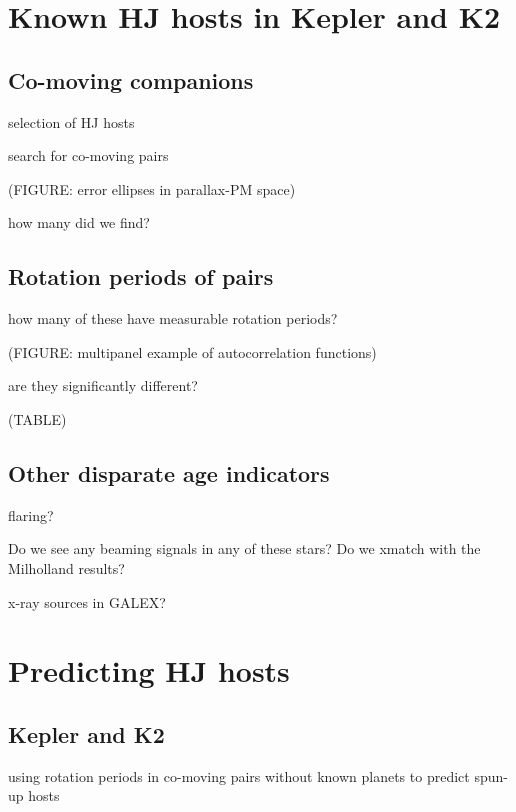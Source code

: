 \documentclass[twocolumn]{aastex62}
\begin{document}



\section{Known HJ hosts in Kepler and K2}
\subsection{Co-moving companions}

selection of HJ hosts

search for co-moving pairs

(FIGURE: error ellipses in parallax-PM space)

how many did we find?






\subsection{Rotation periods of pairs}

how many of these have measurable rotation periods?

(FIGURE: multipanel example of autocorrelation functions)

are they significantly different?

(TABLE)

\subsection{Other disparate age indicators}

flaring?

Do we see any beaming signals in any of these stars? Do we xmatch with the Milholland results?

x-ray sources in GALEX?



\section{Predicting HJ hosts}
\subsection{Kepler and K2}
using rotation periods in co-moving pairs without known planets to predict spun-up hosts
\end{document}
